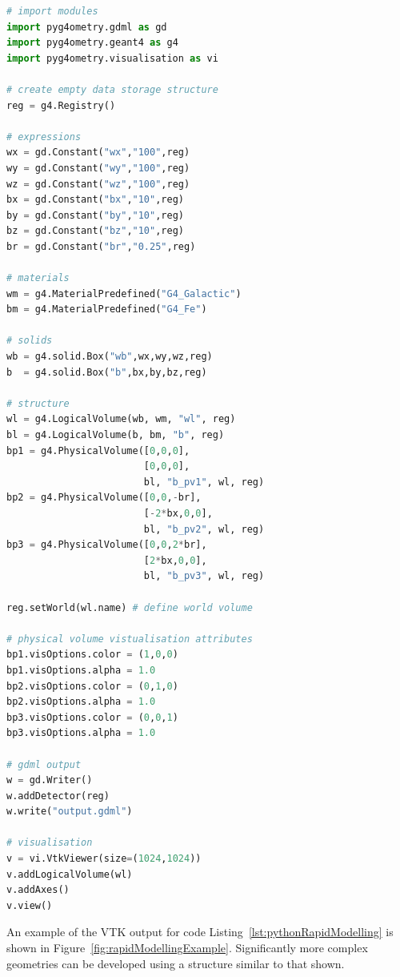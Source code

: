 \documentclass[preprint,12pt]{elsarticle}
\newcommand{\PYGEOMETRY}{\textsc{Pyg4ometry}}
\begin{document}
\begin{lstlisting}[caption={A simple Python script using \PYGEOMETRY{} to create a simple Geant4 geometry.},label={lst:pythonRapidModelling}, language=Python]
# import modules
import pyg4ometry.gdml as gd
import pyg4ometry.geant4 as g4
import pyg4ometry.visualisation as vi

# create empty data storage structure
reg = g4.Registry()

# expressions
wx = gd.Constant("wx","100",reg)
wy = gd.Constant("wy","100",reg)
wz = gd.Constant("wz","100",reg)
bx = gd.Constant("bx","10",reg)
by = gd.Constant("by","10",reg)
bz = gd.Constant("bz","10",reg)
br = gd.Constant("br","0.25",reg)

# materials
wm = g4.MaterialPredefined("G4_Galactic")
bm = g4.MaterialPredefined("G4_Fe")

# solids
wb = g4.solid.Box("wb",wx,wy,wz,reg)
b  = g4.solid.Box("b",bx,by,bz,reg)

# structure
wl = g4.LogicalVolume(wb, wm, "wl", reg)
bl = g4.LogicalVolume(b, bm, "b", reg)
bp1 = g4.PhysicalVolume([0,0,0],
                        [0,0,0],
                        bl, "b_pv1", wl, reg)
bp2 = g4.PhysicalVolume([0,0,-br],
                        [-2*bx,0,0],
                        bl, "b_pv2", wl, reg)
bp3 = g4.PhysicalVolume([0,0,2*br],
                        [2*bx,0,0],
                        bl, "b_pv3", wl, reg)

reg.setWorld(wl.name) # define world volume

# physical volume vistualisation attributes
bp1.visOptions.color = (1,0,0)
bp1.visOptions.alpha = 1.0
bp2.visOptions.color = (0,1,0)
bp2.visOptions.alpha = 1.0
bp3.visOptions.color = (0,0,1)
bp3.visOptions.alpha = 1.0

# gdml output
w = gd.Writer()
w.addDetector(reg)
w.write("output.gdml")

# visualisation
v = vi.VtkViewer(size=(1024,1024))
v.addLogicalVolume(wl)
v.addAxes()
v.view()
\end{lstlisting}

An example of the VTK output for code
Listing~\ref{lst:pythonRapidModelling} is shown in
Figure~\ref{fig:rapidModellingExample}. Significantly more complex
geometries can be developed using a structure similar to that shown.
\end{document}
